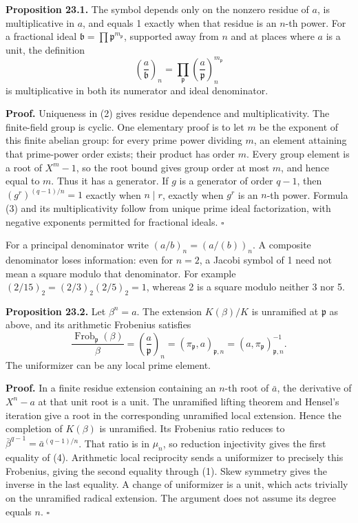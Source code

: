 \documentclass[11pt,a4paper]{article}
\begin{document}
\textbf{Proposition 23.1.} The symbol depends only on the nonzero
residue of \(a\), is multiplicative in \(a\), and equals 1 exactly when
that residue is an \(n\)-th power. For a fractional ideal
\(\mathfrak b=\prod\mathfrak p^{m_{\mathfrak p}}\), supported away from
\(n\) and at places where \(a\) is a unit, the definition \[
\left(\frac a{\mathfrak b}\right)_n
=\prod_{\mathfrak p}\left(\frac a{\mathfrak p}\right)_n^{m_{\mathfrak p}}
\tag{3}
\] is multiplicative in both its numerator and ideal denominator.

\textbf{Proof.} Uniqueness in (2) gives residue dependence and
multiplicativity. The finite-field group is cyclic. One elementary proof
is to let \(m\) be the exponent of this finite abelian group: for every
prime power dividing \(m\), an element attaining that prime-power order
exists; their product has order \(m\). Every group element is a root of
\(X^m-1\), so the root bound gives group order at most \(m\), and hence
equal to \(m\). Thus it has a generator. If \(g\) is a generator of
order \(q-1\), then \((g^r)^{(q-1)/n}=1\) exactly when \(n\mid r\),
exactly when \(g^r\) is an \(n\)-th power. Formula (3) and its
multiplicativity follow from unique prime ideal factorization, with
negative exponents permitted for fractional ideals. \(\square\)

For a principal denominator write \((a/b)_n=(a/(b))_n\). A composite
denominator loses information: even for \(n=2\), a Jacobi symbol of 1
need not mean a square modulo that denominator. For example
\((2/15)_2=(2/3)_2(2/5)_2=1\), whereas 2 is a square modulo neither 3
nor 5.

\textbf{Proposition 23.2.} Let \(\beta^n=a\). The extension
\(K(\beta)/K\) is unramified at \(\mathfrak p\) as above, and its
arithmetic Frobenius satisfies \[
\frac{\operatorname{Frob}_{\mathfrak p}(\beta)}\beta
=\left(\frac a{\mathfrak p}\right)_n
=(\pi_{\mathfrak p},a)_{\mathfrak p,n}
=(a,\pi_{\mathfrak p})_{\mathfrak p,n}^{-1}.
\tag{4}
\] The uniformizer can be any local prime element.

\textbf{Proof.} In a finite residue extension containing an \(n\)-th
root of \(\bar a\), the derivative of \(X^n-a\) at that unit root is a
unit. The unramified lifting theorem and Hensel's iteration give a root
in the corresponding unramified local extension. Hence the completion of
\(K(\beta)\) is unramified. Its Frobenius ratio reduces to
\(\bar\beta^{q-1}=\bar a^{(q-1)/n}\). That ratio is in \(\mu_n\), so
reduction injectivity gives the first equality of (4). Arithmetic local
reciprocity sends a uniformizer to precisely this Frobenius, giving the
second equality through (1). Skew symmetry gives the inverse in the last
equality. A change of uniformizer is a unit, which acts trivially on the
unramified radical extension. The argument does not assume its degree
equals \(n\). \(\square\)
\end{document}
